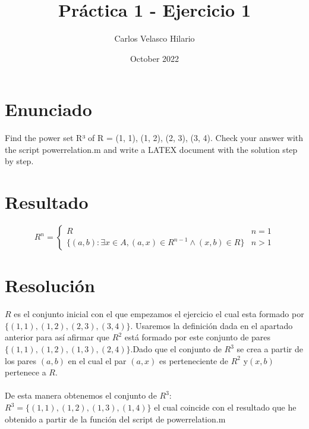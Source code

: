 \documentclass{article}
\title{Práctica 1 - Ejercicio 1}
\author{Carlos Velasco Hilario}
\date{October 2022}
\begin{document}
\maketitle{}

\section*{Enunciado}
Find the power set R³ of R = {(1, 1), (1, 2), (2, 3), (3, 4)}. Check your answer with the script powerrelation.m and write a LATEX document with the
solution step by step.
\\
\section*{Resultado}
\begin{equation}
R^n =
    \begin{cases}
   
            R & n = 1
          \\  \{(a,b) : \exists x \in A, (a,x) \in R^{n-1} \wedge (x,b) \in R\} & n > 1
           
   
    \end{cases}
\end{equation}

\section*{Resolución}
$R$ es el conjunto inicial con el que empezamos el ejercicio el cual esta formado por $\lbrace{(1, 1),(1, 2),(2, 3),(3, 4)}\rbrace$. Usaremos la definición dada en el apartado anterior para así afirmar que $R^2$ está formado por este conjunto de pares $\lbrace{(1, 1),(1, 2),(1, 3),(2, 4)}\rbrace$.Dado que el conjunto de $R^3$ se crea a partir de los pares $(a,b)$ en el cual el par $(a,x)$ es perteneciente de $R^2$  y$(x,b)$ pertenece a $R $.
\\
\\
De esta manera obtenemos el conjunto de $R^3$: $R^3 = \lbrace{(1,1),(1,2),(1,3),(1,4)}\rbrace$ el cual coincide con el resultado que he obtenido a partir de la función del script de powerrelation.m
\end{document}
